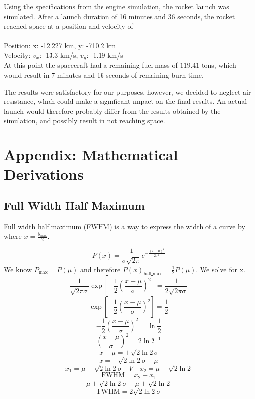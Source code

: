 \documentclass[reprint,english,notitlepage]{revtex4-2}
\begin{document}
Using the specifications from the engine simulation, the rocket launch was simulated.
After a launch duration of 16 minutes and 36 seconds, the rocket reached space at a position and velocity of\\\\
Position: x: -12'227 km, y: -710.2 km\\
Velocity: $v_x$: -13.3 km/s, $v_y$: -1.19 km/s\\

At this point the spacecraft had a remaining fuel mass of $119.41$ tons, which would result in 7 minutes and 16 seconds of remaining burn time.

The results were satisfactory for our purposes, however, we decided to neglect air resistance, which could make a significant impact on the final results.
An actual launch would therefore probably differ from the results obtained by the simulation, and possibly result in not reaching space.


\section{Appendix: Mathematical Derivations}
	\subsection{Full Width Half Maximum}\label{der: FWHM}
	Full width half maximum (FWHM) is a way to express the width of a curve by where $ x = \frac{y_{\text{max}}}{2} $.
		
	\[
	P(x) = \frac{1}{σ \sqrt{2π} }e ^{- \frac{\left( x - μ \right) ^{2}}{2σ^{2}}}
	\]
	We know $ P_{\text{max}} = P(μ) $ and therefore $ P(x)_{\text{half max}} = \frac{1}{2} P(μ) $. We solve for x.
	\[
	\frac{1}{\sqrt{2πσ}} \exp \left[ - \frac{1}{2} \left( \frac{x - μ}{σ} \right) ^{2} \right]  = \frac{1}{2\sqrt{2πσ}}
	\]
	\[
	\exp \left[ - \frac{1}{2} \left( \frac{x - μ}{σ} \right) ^{2} \right] = \frac{1}{2}
	\]
	\[
	- \frac{1}{2} \left( \frac{x - μ}{σ} \right) ^{2} = \ln \frac{1}{2}
	\]
	\[
		\left( \frac{x - μ}{σ} \right) ^{2} = 2\ln 2^{-1}
	\]
	\[
	x - μ = ± \sqrt{2\ln 2} σ 
	\]
	\[
	x = ± \sqrt{2\ln 2} σ - μ
	\]
	\[
	x_1 = μ - \sqrt{2\ln 2} σ \quad V \quad x_2 = μ + \sqrt{2\ln 2} 
	\]
	\[
	\text{FWHM} = x_2 - x_1
	\]
	\[
	μ + \sqrt{2\ln 2} σ - μ + \sqrt{2\ln 2}
	\]
	\[
	\text{FWHM} = 2\sqrt{2\ln 2} σ 
	\]
	
	
\end{document}
